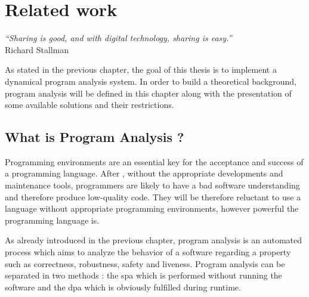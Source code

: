 
\chapter{Related work}
\label{chap:relatedwork}
\begin{flushright}
\textit{``Sharing is good, and with digital technology, sharing is easy.''} \\ Richard Stallman
\end{flushright}

As stated in the previous chapter, the goal of this thesis is to implement a dynamical program analysis system. In order to build a theoretical background, program analysis will be defined in this chapter along with the presentation of some available solutions and their restrictions.

\section{What is Program Analysis ?} 
Programming environments are an essential key for the acceptance and success of a programming language. After \cite{Ducasse1994}, without the appropriate developments and maintenance tools, programmers are likely to have a bad software understanding and therefore produce low-quality code. They will be therefore reluctant to use a language without appropriate programming environments, however powerful the programming language is.

As already introduced in the previous chapter, program analysis is an automated process which aims to analyze the behavior of a software regarding a property such as correctness, robustness, safety and liveness. Program analysis can be separated in two methods : the \gls{spa} which is performed without running the software and the \gls{dpa} which is obviously fulfilled during runtime. \citep{Wikipedi2016}


